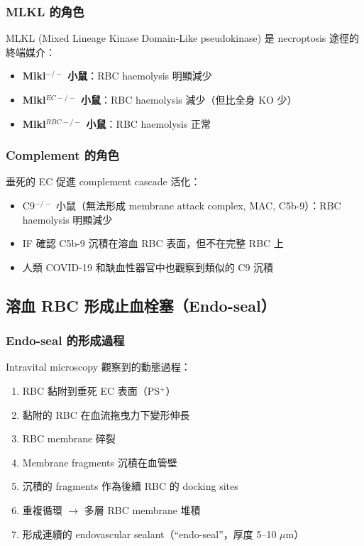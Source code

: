 \documentclass[12pt,a4paper]{article}
\begin{document}
\subsubsection{MLKL 的角色}

MLKL (Mixed Lineage Kinase Domain-Like pseudokinase) 是 necroptosis 途徑的終端媒介：

\begin{itemize}
    \item \textbf{Mlkl$^{-/-}$ 小鼠}：RBC haemolysis 明顯減少
    \item \textbf{Mlkl$^{EC-/-}$ 小鼠}：RBC haemolysis 減少（但比全身 KO 少）
    \item \textbf{Mlkl$^{RBC-/-}$ 小鼠}：RBC haemolysis 正常
\end{itemize}


\subsubsection{Complement 的角色}

垂死的 EC 促進 complement cascade 活化：
\begin{itemize}
    \item C9$^{-/-}$ 小鼠（無法形成 membrane attack complex, MAC, C5b-9）：RBC haemolysis 明顯減少
    \item IF 確認 C5b-9 沉積在溶血 RBC 表面，但不在完整 RBC 上
    \item 人類 COVID-19 和缺血性器官中也觀察到類似的 C9 沉積
\end{itemize}

\subsection{溶血 RBC 形成止血栓塞（Endo-seal）}

\subsubsection{Endo-seal 的形成過程}

Intravital microscopy 觀察到的動態過程：
\begin{enumerate}
    \item RBC 黏附到垂死 EC 表面（PS$^+$）
    \item 黏附的 RBC 在血流拖曳力下變形伸長
    \item RBC membrane 碎裂
    \item Membrane fragments 沉積在血管壁
    \item 沉積的 fragments 作為後續 RBC 的 docking sites
    \item 重複循環 $\rightarrow$ 多層 RBC membrane 堆積
    \item 形成連續的 endovascular sealant（``endo-seal''，厚度 5--10 $\mu$m）
\end{enumerate}
\end{document}
